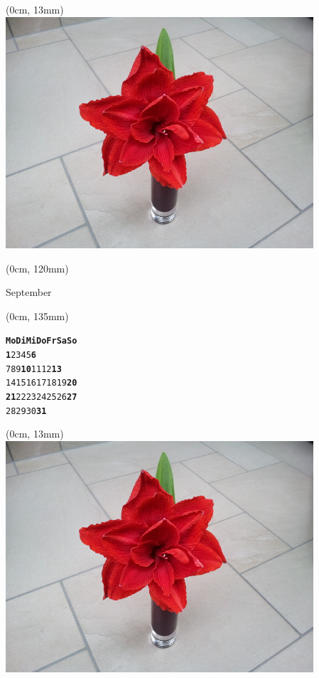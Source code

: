 \documentclass[a5paper]{article}
\newcommand{\weekdays}[1]{\textbf{#1}}
\newcommand{\sunday}[1]{\textcolor{sunday}{\textbf{#1}}}
\newcommand{\holiday}[1]{\textcolor{holiday}{\textbf{#1}}}
\begin{document}
\begin{textblock*}{\paperwidth} (0cm, 13mm)
    \centering
    \includegraphics[width=0.86\textwidth]{test.jpg}
\end{textblock*}

\begin{textblock*}{\paperwidth} (0cm, 120mm)
    \begin{center}
        \Huge{}September
    \end{center}
\end{textblock*}

\begin{textblock*}{\paperwidth} (0cm, 135mm)
    \begin{center}
        \begin{varwidth}{\linewidth}
            \begin{alltt}
\LARGE
\weekdays{Mo Di Mi Do Fr Sa So}
    \holiday{1}  2  3  4  5  \sunday{6}
 7  8  9 \holiday{10} 11 12 \sunday{13}
14 15 16 17 18 19 \sunday{20}
\holiday{21} 22 23 24 25 26 \sunday{27}
28 29 30 \holiday{31}         
            \end{alltt}
        \end{varwidth}
    \end{center}
\end{textblock*}

\hfill
\newpage

\begin{textblock*}{\paperwidth} (0cm, 13mm)
    \centering
    \includegraphics[width=0.86\textwidth]{test.jpg}
\end{textblock*}
\end{document}
